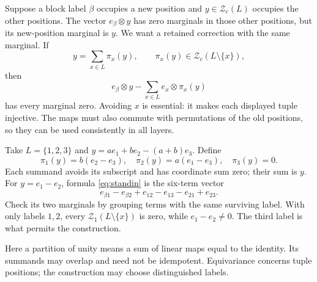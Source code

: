 Suppose a block label $\beta$ occupies a new position and $y\in \mathcal Z_c(L)$ occupies the other positions. The vector $e_\beta\otimes y$ has zero marginals in those other positions, but its new-position marginal is $y$. We want a retained correction with the same marginal. If
\[y=\sum_{x\in L}\pi_x(y),\qquad \pi_x(y)\in \mathcal Z_c(L\setminus\{x\}),
\]
then
\begin{equation}\label{eq:standin}
e_\beta\otimes y-\sum_{x\in L}e_x\otimes\pi_x(y)
\end{equation}
has every marginal zero. Avoiding $x$ is essential: it makes each displayed tuple injective. The maps must also commute with permutations of the old positions, so they can be used consistently in all layers.

\begin{example}
Take $L=\{1,2,3\}$ and $y=a e_1+b e_2-(a+b)e_3$. Define
\[\pi_1(y)=b(e_2-e_3),\quad \pi_2(y)=a(e_1-e_3),\quad\pi_3(y)=0.
\]
Each summand avoids its subscript and has coordinate sum zero; their sum is $y$. For $y=e_1-e_2$, formula \eqref{eq:standin} is the six-term vector
\[e_{\beta1}-e_{\beta2}+e_{12}-e_{13}-e_{21}+e_{23}.
\]
Check its two marginals by grouping terms with the same surviving label. With only labels $1,2$, every $\mathcal Z_1(L\setminus\{x\})$ is zero, while $e_1-e_2\ne0$. The third label is what permits the construction.
\end{example}

Here a partition of unity means a sum of linear maps equal to the
identity. Its summands may overlap and need not be idempotent.
Equivariance concerns tuple positions; the construction may choose
distinguished labels.

